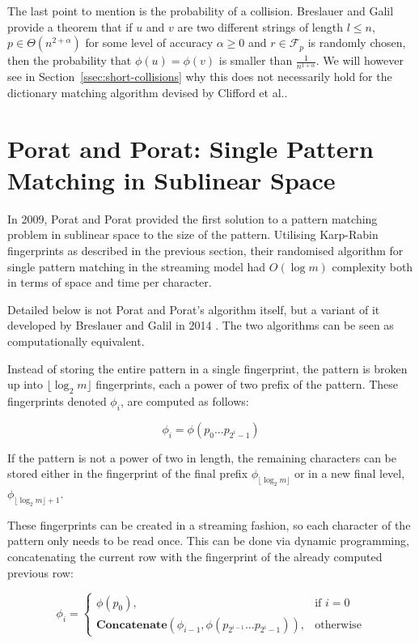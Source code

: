 \documentclass[ %
                    author={Dominic Joseph Moylett},
                    degree={MEng},
                     title={Dictionary Matching with Fingerprints},
                  subtitle={An Empirical Analysis},
                      type={research},
                      year={2015} ]{dissertation}
\begin{document}
The last point to mention is the probability of a collision. Breslauer and Galil \cite{Breslauer:2014:RSS:2660854.2635814} provide a theorem that if $u$ and $v$ are two different strings of length $l \leq n$, $p \in \Theta(n^{2 + \alpha})$ for some level of accuracy $\alpha \geq 0$ and $r \in \mathcal{F}_p$ is randomly chosen, then the probability that $\phi(u) = \phi(v)$ is smaller than $\frac{1}{n^{1 + \alpha}}$. We will however see in Section~\ref{ssec:short-collisions} why this does not necessarily hold for the dictionary matching algorithm devised by Clifford et al.\@ \cite{2015arXiv150406242C}.

\section{Porat and Porat: Single Pattern Matching in Sublinear Space}
\label{sec:porat-porat}

In 2009, Porat and Porat \cite{5438620} provided the first solution to a pattern matching problem in sublinear space to the size of the pattern. Utilising Karp-Rabin fingerprints as described in the previous section, their randomised algorithm for single pattern matching in the streaming model had $O(\log m)$ complexity both in terms of space and time per character.

Detailed below is not Porat and Porat's algorithm itself, but a variant of it developed by Breslauer and Galil in 2014 \cite{Breslauer:2014:RSS:2660854.2635814}. The two algorithms can be seen as computationally equivalent.

Instead of storing the entire pattern in a single fingerprint, the pattern is broken up into $\lfloor \log_2 m\rfloor$ fingerprints, each a power of two prefix of the pattern. These fingerprints denoted $\phi_i$, are computed as follows:

$$\phi_i = \phi(p_0...p_{2^i-1})$$

If the pattern is not a power of two in length, the remaining characters can be stored either in the fingerprint of the final prefix $\phi_{\lfloor\log_2m\rfloor}$ or in a new final level, $\phi_{\lfloor\log_2m\rfloor + 1}$.

These fingerprints can be created in a streaming fashion, so each character of the pattern only needs to be read once. This can be done via dynamic programming, concatenating the current row with the fingerprint of the already computed previous row:

\[
  \phi_i =
  \begin{cases}
    \phi(p_0),& \text{if } i = 0\\
    \textbf{Concatenate}(\phi_{i - 1}, \phi(p_{2^{i-1}}...p_{2^i-1})),& \text{otherwise}
  \end{cases}
\]
\end{document}
